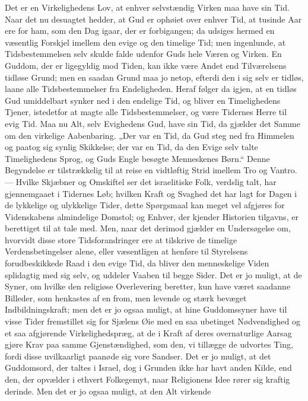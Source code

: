 \documentclass[12pt,a4paper]{book}
\begin{document}
Det er en Virkelighedens Lov, at enhver selvstændig Virken maa have sin Tid.
Naar det nu desuagtet hedder, at Gud er ophøiet over enhver Tid, at tusinde Aar
ere for ham, som den Dag igaar, der er forbigangen; da udsiges hermed en
væsentlig Forskjel imellem den evige og den timelige Tid; men ingenlunde, at
Tidsbestemmelsen selv skulde falde udenfor Guds hele Væren og Virken. En
Guddom, der er ligegyldig mod Tiden, kan ikke være Andet end Tilværelsens
tidløse Grund; men en saadan Grund maa jo netop, efterdi den i sig selv er
tidløs, laane alle Tidsbestemmelser fra Endeligheden. Heraf følger da igjen, at
en tidløs Gud umiddelbart synker ned i den endelige Tid, og bliver en
Timelighedens Tjener, istedetfor at magte alle Tidsbestemmelser, og være
Tidernes Herre til evig Tid. Maa nu Alt, selv Evighedens Gud, have sin Tid, da
gjælder det Samme om den virkelige Aabenbaring. „Der var en Tid, da Gud steg ned
fra Himmelen og paatog sig synlig Skikkelse; der var en Tid, da den Evige selv
talte Timelighedens Sprog, og Guds Engle besøgte Menneskenes Børn.“ Denne
Begyndelse er tilstrækkelig til at reise en vidtløftig Strid imellem Tro og
Vantro. --- Hvilke Skjæbner og Omskiftel\-%
ser det israelitiske Folk, verdslig talt, har gjennemgaaet i Tidernes Løb;
hvilken Kraft og Svaghed det har lagt for Dagen i de lykkelige og ulykkelige
Tider, dette Spørgsmaal kan meget vel afgjøres for Videnskabens almindelige
Domstol; og Enhver, der kjender Historien tilgavns, er berettiget til at tale
med. Men, naar det derimod gjælder en Undersøgelse om, hvorvidt disse store
Tidsforandringer ere at tilskrive de timelige Verdensbetingelser alene, eller
væsentligen at henføre til Styrelsens forudbeskikkede Raad i den evige Tid, da
bliver den menneskelige Viden splidagtig med sig selv, og uddeler Vaaben til
begge Sider. Det er jo muligt, at de Syner, om hvilke den religiøse Overlevering
beretter, kun have været saadanne Billeder, som henkastes af en from, men
levende og stærk bevæget Indbildningskraft; men det er jo ogsaa muligt, at hine
Guddomssyner have til visse Tider fremstillet sig for Sjælens Øie med en saa
ubetinget Nødvendighed og et saa afgjørende Virkelighedspræg, at de i Kraft af
deres overnaturlige Aarsag gjøre Krav paa samme Gjenstændighed, som den, vi
tillægge de udvortes Ting, fordi disse uvilkaarligt paanøde sig vore Sandser.
Det er jo muligt, at det Guddomsord, der taltes i Israel, dog i Grunden ikke har
havt anden Kilde, end den, der opvælder i ethvert Folkegemyt, naar Religionens
Idee rører sig kraftig derinde. Men det er jo ogsaa muligt, at den Alt virkende
\end{document}

